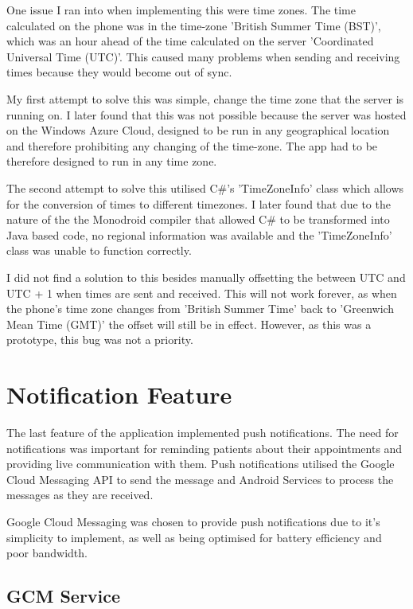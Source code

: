 One issue I ran into when implementing this were time zones. The time calculated on the phone was in the time-zone 'British Summer Time (BST)', which was an hour ahead of the time calculated on the server 'Coordinated Universal Time (UTC)'. This caused many problems when sending and receiving times because they would become out of sync. 

My first attempt to solve this was simple, change the time zone that the server is running on. I later found that this was not possible because the server was hosted on the Windows Azure Cloud, designed to be run in any geographical location and therefore prohibiting any changing of the time-zone. The app had to be therefore designed to run in any time zone.

The second attempt to solve this utilised C\#'s 'TimeZoneInfo' class which allows for the conversion of times to different timezones. I later found that due to the nature of the the Monodroid compiler that allowed C\# to be transformed into Java based code, no regional information was available and the 'TimeZoneInfo' class was unable to function correctly.

I did not find a solution to this besides manually offsetting the between UTC and UTC + 1 when times are sent and received. This will not work forever, as when the phone's time zone changes from 'British Summer Time' back to 'Greenwich Mean Time (GMT)' the offset will still be in effect. However, as this was a prototype, this bug was not a priority.

\section{Notification Feature}

The last feature of the application implemented push notifications. The need for notifications was important for reminding patients about their appointments and providing live communication with them. Push notifications utilised the Google Cloud Messaging API to send the message and Android Services to process the messages as they are received.

Google Cloud Messaging was chosen to provide push notifications due to it's simplicity to implement, as well as being optimised for battery efficiency and poor bandwidth.

\subsection{GCM Service}

